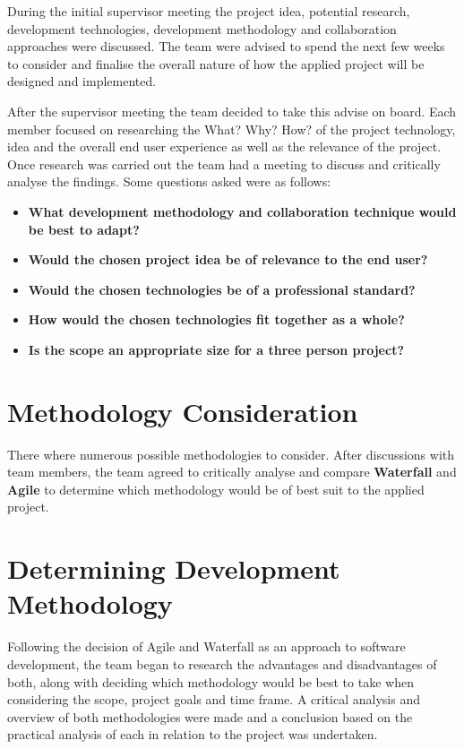 During the initial supervisor meeting the project idea, potential research, development technologies, development methodology and collaboration approaches were discussed. The team were advised to spend the next few weeks to consider and finalise the overall nature of how the applied project will be designed and implemented.

\vspace{5mm} %

After the supervisor meeting the team decided to take this advise on board. Each member focused on researching the What? Why? How? of the project technology, idea and the overall end user experience as well as the relevance of the project. Once research was carried out the team had a meeting to discuss and critically analyse the findings. Some questions asked were as follows:

\begin{itemize}

    \item \textbf{What development methodology and collaboration technique would be best to adapt?}

    \item \textbf{Would the chosen project idea be of relevance to the end user?}

     \item \textbf{Would the chosen technologies be of a professional standard?}

    \item \textbf{How would the chosen technologies fit together as a whole?}

    \item \textbf{Is the scope an appropriate size for a three person project?}

\end{itemize}

\section{Methodology Consideration}
There where numerous possible methodologies to consider. After discussions with team members, the team agreed to critically analyse and compare \textbf{Waterfall} and \textbf{Agile} to determine which methodology would be of best suit to the applied project.


\vspace{70mm} %


\section{Determining Development Methodology}
Following the decision of Agile and Waterfall as an approach to software development, the team began to research the advantages and disadvantages of both, along with deciding which methodology would be best to take when considering the scope, project goals and time frame. A critical analysis and overview of both methodologies were made and a conclusion based on the practical analysis of each in relation to the project was undertaken.

